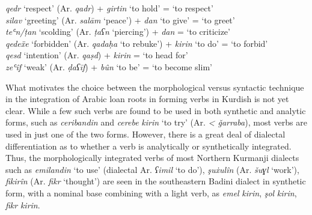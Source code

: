 \documentclass[output=paper]{langsci/langscibook}
\begin{document}
\ea\label{compound}
\textit{qedr} ‘respect’              (Ar. \textit{qadr})                +   \textit{girtin} ‘to hold’    =  ‘to respect’     \\
\textit{silav} ‘greeting’            (Ar. \textit{salām} ‘peace’)       +   \textit{dan} ‘to give’       =   ‘to greet’      \\
\textit{teʿn\slash ṭan} ‘scolding’   (Ar. \textit{ṭaʕn} ‘piercing’)     + \textit{dan}                   =   ‘to criticize’  \\
\textit{qedeẍe} ‘forbidden’          (Ar. \textit{qadaḥa} ‘to rebuke’)  +   \textit{kirin} ‘to do’       =   ‘to forbid’     \\
\textit{qesd} ‘intention’            (Ar. \textit{qaṣd})                +   \textit{kirin}               =   ‘to head for’   \\
\textit{zeʿîf} ‘weak’                (Ar. \textit{ḍaʕīf})               +   \textit{bûn} ‘to be’         =   ‘to become slim’
\z

What motivates the choice between the morphological versus syntactic technique in the integration of Arabic loan roots in forming verbs in Kurdish is not yet clear. While a few such verbs are found to be used in both synthetic and analytic forms, such as \textit{ceribandin} and \textit{cerebe} \textit{kirin} ‘to try’ (Ar. \textit{< ǧarraba}), most verbs are used in just one of the two forms. However, there is a great deal of dialectal differentiation as to whether a verb is analytically or synthetically integrated. Thus, the morphologically integrated verbs of most Northern Kurmanji dialects such as \textit{emilandin} ‘to use’ (dialectal Ar. \textit{ʕimil} ‘to do’), \textit{şuẋulîn} (Ar. \textit{šuɣl} ‘work’), \textit{fikirîn} (Ar. \textit{fikr} ‘thought’) are seen in the southeastern Badini dialect in synthetic form, with a nominal base combining with a light verb, as \textit{emel} \textit{kirin}, \textit{şol} \textit{kirin}, \textit{fikr} \textit{kirin}.   
\end{document}
